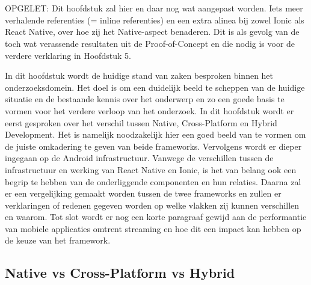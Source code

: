 \chapter{}%
\label{ch:stand-van-zaken}



OPGELET: Dit hoofdstuk zal hier en daar nog wat aangepast worden. Iets meer verhalende referenties (= inline referenties) en een extra alinea bij zowel Ionic als React Native, over hoe zij het Native-aspect benaderen. Dit is als gevolg van de toch wat verassende resultaten uit de Proof-of-Concept en die nodig is voor de verdere verklaring in Hoofdstuk 5.



In dit hoofdstuk wordt de huidige stand van zaken besproken binnen het onderzoeksdomein. Het doel is om een duidelijk beeld te scheppen van de huidige situatie en de bestaande kennis over het onderwerp en zo een goede basis te vormen voor het verdere verloop van het onderzoek. In dit hoofdstuk wordt er eerst gesproken over het verschil tussen Native, Cross-Platform en Hybrid Development. Het is namelijk noodzakelijk hier een goed beeld van te vormen om de juiste omkadering te geven van beide frameworks. Vervolgens wordt er dieper ingegaan op de Android infrastructuur. Vanwege de verschillen tussen de infrastructuur en werking van React Native en Ionic, is het van belang ook een begrip te hebben van de onderliggende componenten en hun relaties. Daarna zal er een vergelijking gemaakt worden tussen de twee frameworks en zullen er verklaringen of redenen gegeven worden op welke vlakken zij kunnen verschillen en waarom. Tot slot wordt er nog een korte paragraaf gewijd aan de performantie van mobiele applicaties omtrent streaming en hoe dit een impact kan hebben op de keuze van het framework.

\section{Native vs Cross-Platform vs Hybrid}
\label{sec:native-cross-hybrid}

